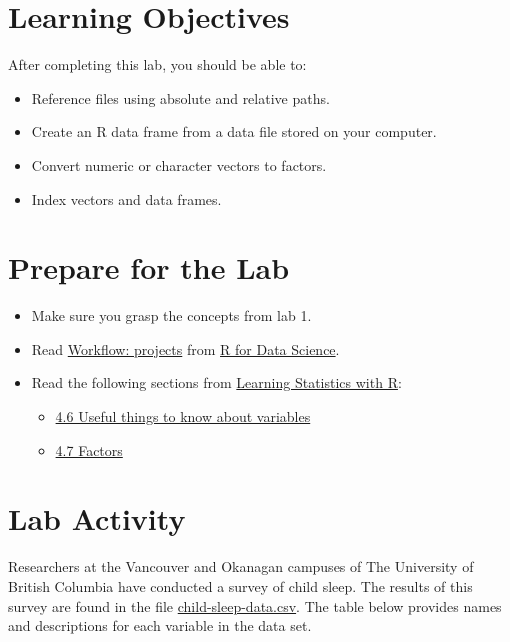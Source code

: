 \documentclass[
]{book}
\providecommand{\tightlist}{%
  \setlength{\itemsep}{0pt}\setlength{\parskip}{0pt}}
\begin{document}
\hypertarget{learning-objectives-1}{%
\section{Learning Objectives}\label{learning-objectives-1}}

After completing this lab, you should be able to:

\begin{itemize}
\tightlist
\item
  Reference files using absolute and relative paths.
\item
  Create an R data frame from a data file stored on your computer.
\item
  Convert numeric or character vectors to factors.
\item
  Index vectors and data frames.
\end{itemize}

\hypertarget{prepare-for-the-lab-1}{%
\section{Prepare for the Lab}\label{prepare-for-the-lab-1}}

\begin{itemize}
\tightlist
\item
  Make sure you grasp the concepts from lab 1.
\item
  Read \href{https://r4ds.had.co.nz/workflow-projects.html}{Workflow: projects} from \href{https://r4ds.had.co.nz/}{R for Data Science}.
\item
  Read the following sections from \href{https://learningstatisticswithr.com/}{Learning Statistics with R}:

  \begin{itemize}
  \tightlist
  \item
    \href{https://learningstatisticswithr.com/book/mechanics.html\#useful}{4.6 Useful things to know about variables}
  \item
    \href{https://learningstatisticswithr.com/book/mechanics.html\#factors}{4.7 Factors}
  \end{itemize}
\end{itemize}

\hypertarget{lab-activity-1}{%
\section{Lab Activity}\label{lab-activity-1}}

Researchers at the Vancouver and Okanagan campuses of The University of British Columbia have conducted a survey of child sleep. The results of this survey are found in the file \href{../assets/documents/child-sleep-data.csv}{child-sleep-data.csv}. The table below provides names and descriptions for each variable in the data set.
\end{document}

